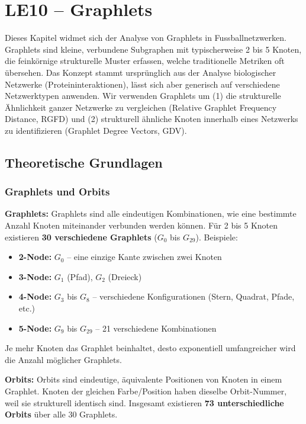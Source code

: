\section{LE10 -- Graphlets}

Dieses Kapitel widmet sich der Analyse von Graphlets in Fussballnetzwerken. Graphlets sind kleine, verbundene Subgraphen mit typischerweise 2 bis 5 Knoten, die feinkörnige strukturelle Muster erfassen, welche traditionelle Metriken oft übersehen. Das Konzept stammt ursprünglich aus der Analyse biologischer Netzwerke (Proteininteraktionen), lässt sich aber generisch auf verschiedene Netzwerktypen anwenden. Wir verwenden Graphlets um (1) die strukturelle Ähnlichkeit ganzer Netzwerke zu vergleichen (Relative Graphlet Frequency Distance, RGFD) und (2) strukturell ähnliche Knoten innerhalb eines Netzwerks zu identifizieren (Graphlet Degree Vectors, GDV).

\subsection{Theoretische Grundlagen}

\subsubsection{Graphlets und Orbits}

\textbf{Graphlets:} Graphlets sind alle eindeutigen Kombinationen, wie eine bestimmte Anzahl Knoten miteinander verbunden werden können. Für 2 bis 5 Knoten existieren \textbf{30 verschiedene Graphlets} ($G_0$ bis $G_{29}$). Beispiele:
\begin{itemize}
  \item \textbf{2-Node:} $G_0$ -- eine einzige Kante zwischen zwei Knoten
  \item \textbf{3-Node:} $G_1$ (Pfad), $G_2$ (Dreieck)
  \item \textbf{4-Node:} $G_3$ bis $G_8$ -- verschiedene Konfigurationen (Stern, Quadrat, Pfade, etc.)
  \item \textbf{5-Node:} $G_9$ bis $G_{29}$ -- 21 verschiedene Kombinationen
\end{itemize}

Je mehr Knoten das Graphlet beinhaltet, desto exponentiell umfangreicher wird die Anzahl möglicher Graphlets.

\textbf{Orbits:} Orbits sind eindeutige, äquivalente Positionen von Knoten in einem Graphlet. Knoten der gleichen Farbe/Position haben dieselbe Orbit-Nummer, weil sie strukturell identisch sind. Insgesamt existieren \textbf{73 unterschiedliche Orbits} über alle 30 Graphlets.

